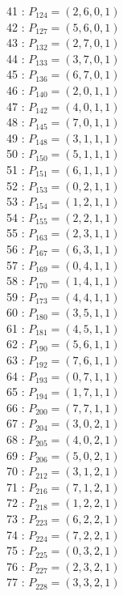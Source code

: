 \documentclass{article}
\begin{document}
{\begin{multicols}{3}
41 : $P_{124}=( 2, 6, 0, 1 )$\\
42 : $P_{127}=( 5, 6, 0, 1 )$\\
43 : $P_{132}=( 2, 7, 0, 1 )$\\
44 : $P_{133}=( 3, 7, 0, 1 )$\\
45 : $P_{136}=( 6, 7, 0, 1 )$\\
46 : $P_{140}=( 2, 0, 1, 1 )$\\
47 : $P_{142}=( 4, 0, 1, 1 )$\\
48 : $P_{145}=( 7, 0, 1, 1 )$\\
49 : $P_{148}=( 3, 1, 1, 1 )$\\
50 : $P_{150}=( 5, 1, 1, 1 )$\\
51 : $P_{151}=( 6, 1, 1, 1 )$\\
52 : $P_{153}=( 0, 2, 1, 1 )$\\
53 : $P_{154}=( 1, 2, 1, 1 )$\\
54 : $P_{155}=( 2, 2, 1, 1 )$\\
55 : $P_{163}=( 2, 3, 1, 1 )$\\
56 : $P_{167}=( 6, 3, 1, 1 )$\\
57 : $P_{169}=( 0, 4, 1, 1 )$\\
58 : $P_{170}=( 1, 4, 1, 1 )$\\
59 : $P_{173}=( 4, 4, 1, 1 )$\\
60 : $P_{180}=( 3, 5, 1, 1 )$\\
61 : $P_{181}=( 4, 5, 1, 1 )$\\
62 : $P_{190}=( 5, 6, 1, 1 )$\\
63 : $P_{192}=( 7, 6, 1, 1 )$\\
64 : $P_{193}=( 0, 7, 1, 1 )$\\
65 : $P_{194}=( 1, 7, 1, 1 )$\\
66 : $P_{200}=( 7, 7, 1, 1 )$\\
67 : $P_{204}=( 3, 0, 2, 1 )$\\
68 : $P_{205}=( 4, 0, 2, 1 )$\\
69 : $P_{206}=( 5, 0, 2, 1 )$\\
70 : $P_{212}=( 3, 1, 2, 1 )$\\
71 : $P_{216}=( 7, 1, 2, 1 )$\\
72 : $P_{218}=( 1, 2, 2, 1 )$\\
73 : $P_{223}=( 6, 2, 2, 1 )$\\
74 : $P_{224}=( 7, 2, 2, 1 )$\\
75 : $P_{225}=( 0, 3, 2, 1 )$\\
76 : $P_{227}=( 2, 3, 2, 1 )$\\
77 : $P_{228}=( 3, 3, 2, 1 )$\\

\end{multicols}}
\end{document}

